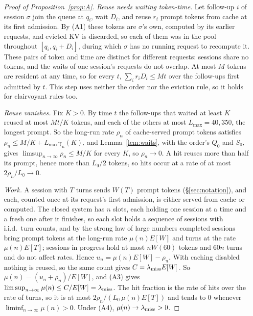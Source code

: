 \begin{proof}[Proof of Proposition~\ref{prop:A}]
\emph{Reuse needs waiting token-time.} Let follow-up $i$ of session $\sigma$ join the queue at $q_i$, wait $D_i$, and reuse $r_i$ prompt tokens from cache at its first admission. By (A1) these tokens are $\sigma$'s own, computed by its earlier requests, and evicted KV is discarded, so each of them was in the pool throughout $[q_i,q_i+D_i]$, during which $\sigma$ has no running request to recompute it. These pairs of token and time are distinct for different requests: sessions share no tokens, and the waits of one session's requests do not overlap. At most $M$ tokens are resident at any time, so for every $t$, $\sum_i r_iD_i\le Mt$ over the follow-ups first admitted by $t$. This step uses neither the order nor the eviction rule, so it holds for clairvoyant rules too.

\emph{Reuse vanishes.} Fix $K>0$. By time $t$ the follow-ups that waited at least $K$ reused at most $Mt/K$ tokens, and each of the others at most $L_{\max}=40{,}350$, the longest prompt. So the long-run rate $\rho_n$ of cache-served prompt tokens satisfies $\rho_n\le M/K+L_{\max}\gamma_n(K)$, and Lemma~\ref{lem:waits}, with the order's $Q_0$ and $S_0$, gives $\limsup_{n\to\infty}\rho_n\le M/K$ for every $K$, so $\rho_n\to0$. A hit reuses more than half its prompt, hence more than $L_0/2$ tokens, so hits occur at a rate of at most $2\rho_n/L_0\to0$.

\emph{Work.} A session with $T$ turns sends $W(T)$ prompt tokens (\S\ref{sec:notation}), and each, counted once at its request's first admission, is either served from cache or computed. The closed system has $n$ slots, each holding one session at a time and a fresh one after it finishes, so each slot holds a sequence of sessions with i.i.d.\ turn counts, and by the strong law of large numbers completed sessions bring prompt tokens at the long-run rate $\mu(n)E[W]$ and turns at the rate $\mu(n)E[T]$; sessions in progress hold at most $nW(60)$ tokens and $60n$ turns and do not affect rates. Hence $u_n=\mu(n)E[W]-\rho_n$. With caching disabled nothing is reused, so the same count gives $C=\lambda_{\mathrm{miss}} E[W]$. So $\mu(n)=(u_n+\rho_n)/E[W]$, and (A3) gives $\limsup_{n\to\infty}\mu(n)\le C/E[W]=\lambda_{\mathrm{miss}}$. The hit fraction is the rate of hits over the rate of turns, so it is at most $2\rho_n/(L_0\,\mu(n)E[T])$ and tends to 0 whenever $\liminf_{n\to\infty}\mu(n)>0$. Under (A4), $\mu(n)\to\lambda_{\mathrm{miss}}>0$.
\end{proof}

